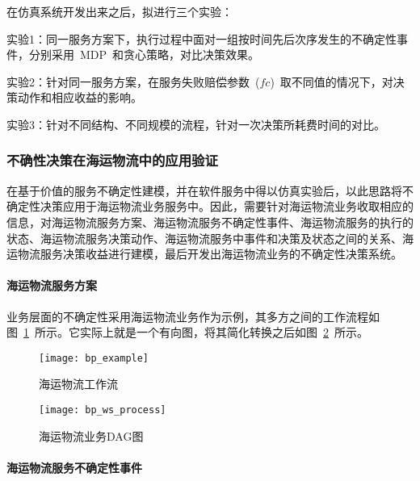 在仿真系统开发出来之后，拟进行三个实验：

实验1：同一服务方案下，执行过程中面对一组按时间先后次序发生的不确定性事件，分别采用~MDP~和贪心策略，对比决策效果。

实验2：针对同一服务方案，在服务失败赔偿参数~($fc$)~取不同值的情况下，对决策动作和相应收益的影响。

实验3：针对不同结构、不同规模的流程，针对一次决策所耗费时间的对比。

\subsubsection{不确性决策在海运物流中的应用验证}

在基于价值的服务不确定性建模，并在软件服务中得以仿真实验后，以此思路将不确定性决策应用于海运物流业务服务中。因此，需要针对海运物流业务收取相应的信息，对海运物流服务方案、海运物流服务不确定性事件、海运物流服务的执行的状态、海运物流服务决策动作、海运物流服务中事件和决策及状态之间的关系、海运物流服务决策收益进行建模，最后开发出海运物流业务的不确定性决策系统。

\setcounter{paragraph}{0}
\paragraph{海运物流服务方案}

%

业务层面的不确定性采用海运物流业务作为示例，其多方之间的工作流程如图~\ref{figure:bp_example}~所示。它实际上就是一个有向图，将其简化转换之后如图~\ref{figure:bp_ws_process}~所示。

\begin{figure}[htbp]
    \centering
    \texttt{[image: bp\_example]}
    \caption{海运物流工作流}\label{figure:bp_example}
    \vspace{-1em}
\end{figure}

\begin{figure}[htbp]
    \centering
    \texttt{[image: bp\_ws\_process]}
    \caption{海运物流业务DAG图}\label{figure:bp_ws_process}
    \vspace{-1em}
\end{figure}

\paragraph{海运物流服务不确定性事件}

